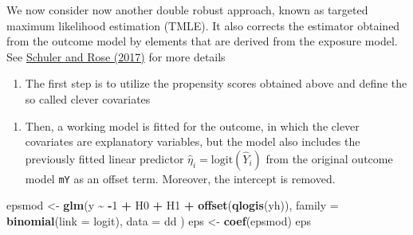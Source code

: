 \documentclass[
]{book}
\newenvironment{Shaded}{\begin{snugshade}}{\end{snugshade}}
\newcommand{\AttributeTok}[1]{\textcolor[rgb]{0.13,0.29,0.53}{#1}}
\newcommand{\DecValTok}[1]{\textcolor[rgb]{0.00,0.00,0.81}{#1}}
\newcommand{\FunctionTok}[1]{\textcolor[rgb]{0.13,0.29,0.53}{\textbf{#1}}}
\newcommand{\NormalTok}[1]{#1}
\newcommand{\OtherTok}[1]{\textcolor[rgb]{0.56,0.35,0.01}{#1}}
\newcommand{\SpecialCharTok}[1]{\textcolor[rgb]{0.81,0.36,0.00}{\textbf{#1}}}
\providecommand{\tightlist}{%
  \setlength{\itemsep}{0pt}\setlength{\parskip}{0pt}}
\begin{document}
We now consider now another double robust approach, known as targeted
maximum likelihood estimation (TMLE). It also corrects the estimator
obtained from the outcome model by elements that are derived from the
exposure model. See \href{https://doi.org/10.1093/aje/kww165}{Schuler and Rose
(2017)} for more details

\begin{enumerate}
\def\labelenumi{\arabic{enumi}.}
\tightlist
\item
  The first step is to utilize the propensity scores obtained above
  and define the so called clever covariates
\end{enumerate}

\begin{Shaded}
\end{Shaded}

\begin{enumerate}
\def\labelenumi{\arabic{enumi}.}
\setcounter{enumi}{1}
\tightlist
\item
  Then, a working model is fitted for the outcome, in which the clever
  covariates are explanatory variables, but the model also includes
  the previously fitted linear predictor
  \(\widehat{\eta}_i = \text{logit}(\widehat Y_i)\) from the original
  outcome model \texttt{mY} as an offset term. Moreover, the intercept is
  removed.
\end{enumerate}

\begin{Shaded}
\begin{Highlighting}[]
\NormalTok{epsmod }\OtherTok{\textless{}{-}} \FunctionTok{glm}\NormalTok{(y }\SpecialCharTok{\textasciitilde{}} \SpecialCharTok{{-}}\DecValTok{1} \SpecialCharTok{+}\NormalTok{ H0 }\SpecialCharTok{+}\NormalTok{ H1 }\SpecialCharTok{+} \FunctionTok{offset}\NormalTok{(}\FunctionTok{qlogis}\NormalTok{(yh)),}
  \AttributeTok{family =} \FunctionTok{binomial}\NormalTok{(}\AttributeTok{link =}\NormalTok{ logit), }\AttributeTok{data =}\NormalTok{ dd}
\NormalTok{)}
\NormalTok{eps }\OtherTok{\textless{}{-}} \FunctionTok{coef}\NormalTok{(epsmod)}
\NormalTok{eps}
\end{Highlighting}
\end{Shaded}
\end{document}
